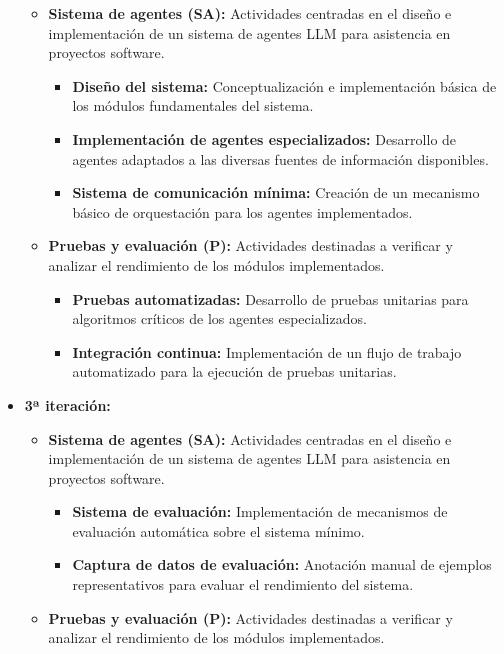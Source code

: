 \begin{itemize}
\begin{itemize}
      \item\textbf{Sistema de agentes (SA):} Actividades centradas en el diseño e implementación de un sistema de agentes LLM para asistencia en proyectos software.
        \begin{itemize}
          \item\textbf{Diseño del sistema:} Conceptualización e implementación básica de los módulos fundamentales del sistema.
          \item\textbf{Implementación de agentes especializados:} Desarrollo de agentes adaptados a las diversas fuentes de información disponibles.
          \item\textbf{Sistema de comunicación mínima:} Creación de un mecanismo básico de orquestación para los agentes implementados.
        \end{itemize}
      \item\textbf{Pruebas y evaluación (P):} Actividades destinadas a verificar y analizar el rendimiento de los módulos implementados.
        \begin{itemize}
        \item\textbf{Pruebas automatizadas:} Desarrollo de pruebas unitarias para algoritmos críticos de los agentes especializados.
        \item\textbf{Integración continua:} Implementación de un flujo de trabajo automatizado para la ejecución de pruebas unitarias.
      \end{itemize}
    \end{itemize}
  \item\textbf{3ª iteración:}
    \begin{itemize}
      \item\textbf{Sistema de agentes (SA):} Actividades centradas en el diseño e implementación de un sistema de agentes LLM para asistencia en proyectos software.
        \begin{itemize}
          \item\textbf{Sistema de evaluación:} Implementación de mecanismos de evaluación automática sobre el sistema mínimo.
          \item\textbf{Captura de datos de evaluación:} Anotación manual de ejemplos representativos para evaluar el rendimiento del sistema. 
        \end{itemize}
      \item\textbf{Pruebas y evaluación (P):} Actividades destinadas a verificar y analizar el rendimiento de los módulos implementados.
        \begin{itemize}

\end{itemize}
\end{itemize}
\end{itemize}
